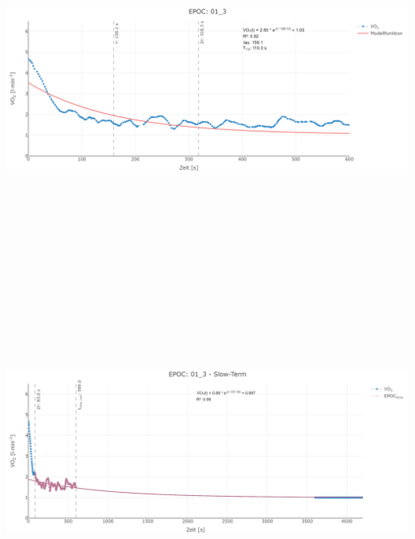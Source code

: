 \documentclass[
  letterpaper,
  DIV=11]{scrartcl}
\begin{document}
\includegraphics[width=11.45833in,height=4.6875in]{images/01_3_tau.png}
\includegraphics[width=11.45833in,height=4.6875in]{images/01_3_slow.png}
\end{document}
